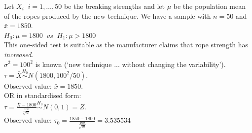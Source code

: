 \documentclass[bigtut]{tutorial}\usepackage[]{graphicx}\usepackage[]{color}
\makeatletter
\newcommand{\hlnum}[1]{\textcolor[rgb]{0.686,0.059,0.569}{#1}}%
\newcommand{\hlopt}[1]{\textcolor[rgb]{0,0,0}{#1}}%
\newcommand{\hlstd}[1]{\textcolor[rgb]{0.345,0.345,0.345}{#1}}%
\newcommand{\hlkwb}[1]{\textcolor[rgb]{0.69,0.353,0.396}{#1}}%
\newcommand{\hlkwd}[1]{\textcolor[rgb]{0.737,0.353,0.396}{\textbf{#1}}}%
\newenvironment{kframe}{%
 \def\at@end@of@kframe{}%
 \ifinner\ifhmode%
  \def\at@end@of@kframe{\end{minipage}}%
  \begin{minipage}{\columnwidth}%
 \fi\fi%
 \def\FrameCommand##1{\hskip\@totalleftmargin \hskip-\fboxsep
 \colorbox{shadecolor}{##1}\hskip-\fboxsep
     \hskip-\linewidth \hskip-\@totalleftmargin \hskip\columnwidth}%
 \MakeFramed {\advance\hsize-\width
   \@totalleftmargin\z@ \linewidth\hsize
   \@setminipage}}%
 {\par\unskip\endMakeFramed%
 \at@end@of@kframe}
\newenvironment{knitrout}{}{} %
\makeatother
\begin{document}
\begin{tutorial}
\begin{questions}


\begin{solution}
Let $X_{i} \;\; i=1,\ldots,50$ be the breaking strengths and let $\mu$ be the population mean of the ropes produced by the new technique.
We have a sample with $n=50$ and $\bar{x}=1850$. \\

$H_0: \mu=1800  \;\; vs \;\; H_1: \mu>1800$ \\
This one-sided test is suitable as  the manufacturer claims that rope strength has {\it increased}. \\

$\sigma^2 = 100^2$ is known (`new technique ... without changing the variability'). \\

$\tau = \bar{X} \overset{H_0}{\sim} N(1800,100^2/50)$. \\
Observed value: $\bar{x} = 1850$. \\

OR in standardised form: \\

$\tau = \frac{ \bar{X} - 1800}{\frac{100}{\sqrt{50}} } \overset{H_0}{\sim} N(0,1) = Z$. \\
Observed value: $\tau_{0} = \frac{1850-1800}{\frac{100}{\sqrt{50}} } = 3.535534 $ \\



\end{solution}
\end{questions}
\end{tutorial}
\end{document}
